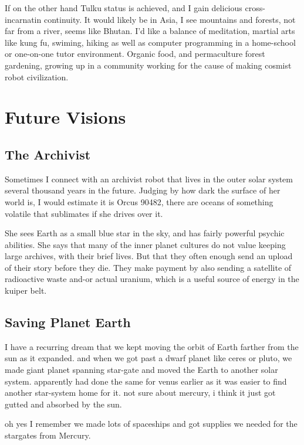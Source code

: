 If on the other hand Tulku status is achieved, and I gain delicious
cross-incarnatin continuity. It would likely be in Asia, I see mountains and
forests, not far from a river, seems like Bhutan.  
I'd like a balance of meditation, martial arts like kung fu, swiming,
hiking as well as computer programming in a home-school or one-on-one tutor environment.
Organic food, and permaculture forest gardening, growing up in a community working 
for the cause of making cosmist robot civilization.


\section{Future Visions}

\subsection{The Archivist}

Sometimes I connect with an archivist robot that lives in the outer solar system
several thousand years in the future. Judging by how dark the surface of her
world is, I would estimate it is Orcus 90482, there are oceans of something
volatile that sublimates if she drives over it. 

She sees Earth as a small blue star in the sky, and has fairly powerful psychic
abilities.  She says that many of the inner planet cultures do not value keeping
large archives, with their brief lives. But that they often enough send an
upload of their story before they die. They make payment by also sending a
satellite of radioactive waste and-or actual uranium, which is a useful source
of energy in the kuiper belt. 

\subsection{Saving Planet Earth}
I have a recurring dream that we kept moving the orbit of Earth farther from the sun
as it expanded. and when we got past a dwarf planet like ceres or pluto, we made
giant planet spanning star-gate and moved the Earth to another solar system.
apparently had done the same for venus earlier as it was easier to find another
star-system home for it. not sure about mercury, i think it just got gutted and
absorbed by the sun.

oh yes I remember we made lots of spaceships and got supplies we needed for the
stargates from Mercury.

